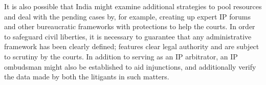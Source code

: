 \begin{multicols}{2}
\noi
It is also possible that India might examine additional strategies to pool resources and deal
with the pending cases by, for example, creating up expert IP forums and other bureaucratic
frameworks with protections to help the courts. In order to safeguard civil liberties, it is
necessary to guarantee that any administrative framework has been clearly defined; features
clear legal authority and are subject to scrutiny by the courts. In addition to serving as an IP
arbitrator, an IP ombudsman might also be established to aid injunctions, and additionally
verify the data made by both the litigants in such matters.

\end{multicols}
\label{end2019-art3}

